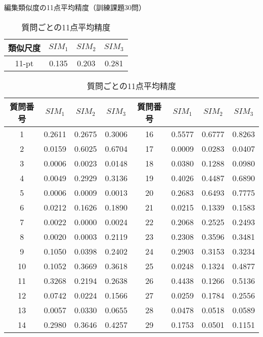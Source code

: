 \begin{table}[bht]
\vspace{-1em}
\caption{編集類似度の11点平均精度（訓練課題30問）}
\vspace{-1em}
\label{sim-11pt-comp}
\begin{center}
  \begin{tabular}{|c||c|c|c|}\hline
    類似尺度 & $SIM_1$ & $SIM_2$ & $SIM_3$ \\\hline\hline
    11-pt & 0.135 & 0.203 & 0.281 \\\hline
  \end{tabular}
\end{center}
\caption{質問ごとの11点平均精度}
\label{sim-each-comp}
\vspace{-1em}
\begin{center}
\hspace*{-1em}
\begin{tabular}{|c||c|c|c||c||c|c|c|}\hline
{\bf 質問番号}&{\bf $SIM_1$}&{\bf $SIM_2$}&{\bf $SIM_3$}&
{\bf 質問番号}&{\bf $SIM_1$}&{\bf $SIM_2$}&{\bf $SIM_3$}\\\hline\hline
 1 & 0.2611 & 0.2675 & 0.3006 & 16 & 0.5577 & 0.6777 & 0.8263\\ \hline
 2 & 0.0159 & 0.6025 & 0.6704 & 17 & 0.0009 & 0.0283 & 0.0407\\ \hline
 3 & 0.0006 & 0.0023 & 0.0148 & 18 & 0.0380 & 0.1288 & 0.0980\\ \hline
 4 & 0.0049 & 0.2929 & 0.3136 & 19 & 0.4026 & 0.4487 & 0.6890\\ \hline
 5 & 0.0006 & 0.0009 & 0.0013 & 20 & 0.2683 & 0.6493 & 0.7775\\ \hline
 6 & 0.0212 & 0.1626 & 0.1890 & 21 & 0.0215 & 0.1339 & 0.1583\\ \hline
 7 & 0.0022 & 0.0000 & 0.0024 & 22 & 0.2068 & 0.2525 & 0.2493\\ \hline
 8 & 0.0020 & 0.0003 & 0.2119 & 23 & 0.2308 & 0.3596 & 0.3481\\ \hline
 9 & 0.1050 & 0.0398 & 0.2402 & 24 & 0.2903 & 0.3153 & 0.3234\\ \hline
10 & 0.1052 & 0.3669 & 0.3618 & 25 & 0.0248 & 0.1324 & 0.4877\\ \hline
11 & 0.3268 & 0.2194 & 0.2638 & 26 & 0.4438 & 0.1266 & 0.5136\\ \hline
12 & 0.0742 & 0.0224 & 0.1566 & 27 & 0.0259 & 0.1784 & 0.2556\\ \hline
13 & 0.0057 & 0.0330 & 0.0655 & 28 & 0.0478 & 0.0518 & 0.0589\\ \hline
14 & 0.2980 & 0.3646 & 0.4257 & 29 & 0.1753 & 0.0501 & 0.1151\\ \hline

\end{tabular}
\end{center}
\end{table}
